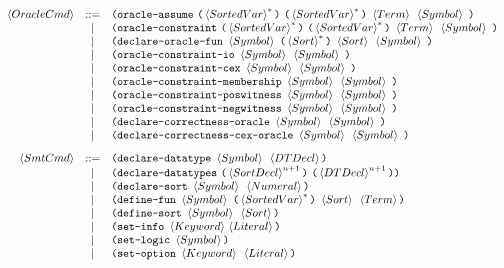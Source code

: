 \documentclass[english,a4paper,10pt]{article}
\begin{document}
\[\begin{array}{rcl}
 \oraclecmd 
 & ::= & \paren{\assumeoraclekwd\mbox{ }\paren{\kstar{\sortedvar}}\mbox{ }\paren{\kstar{\sortedvar}}\mbox{ }
  \term \mbox{ } \symbol\mbox{ }} \\
  & | & \paren{\constraintoraclekwd\mbox{ }\paren{\kstar{\sortedvar}}\mbox{ }\paren{\kstar{\sortedvar}}\mbox{ }
  \term\mbox{ } \symbol\mbox{ }} \\
 & | & \paren{\oracledeckwd\mbox{ }\symbol\mbox{ }\paren{\kstar{\sortexpr}}\mbox{ }\sortexpr\mbox{ }\symbol\mbox{ }} \\
 & | &\paren{\iooracledeckwd\mbox{ }\symbol\mbox{ } \symbol\mbox{ }} \\
 & | &\paren{\cexoracledeckwd\mbox{ }\symbol\mbox{ } \symbol\mbox{ }} \\
 & | &\paren{\memoracledeckwd\mbox{ }\symbol\mbox{ } \symbol\mbox{ }} \\
 & | &\paren{\poswitnessoracledeckwd\mbox{ }\symbol\mbox{ } \symbol\mbox{ }} \\
 & | &\paren{\negwitnessoracledeckwd\mbox{ }\symbol\mbox{ } \symbol\mbox{ }} \\
 & | &\paren{\corroracledeckwd\mbox{ }\symbol\mbox{ } \symbol\mbox{ }} \\
 & | &\paren{\corrcexoracledeckwd\mbox{ }\symbol\mbox{ } \symbol\mbox{ }} \\[2ex]

 \smtcmd 
 & ::= &\paren{\dtdeclkwd\mbox{ }\symbol\mbox{ }\dtdecl} \\
 & | & \paren{\dtsdeclkwd\mbox{ }\paren{\kstarn{\sortdecl}{n+1} }\mbox{ }\paren{\kstarn{\dtdecl}{n+1}}} \\
 & | & \paren{\sortdeclkwd\mbox{ }\symbol\mbox{ }\intconst} \\
 & | & \paren{\fundefkwd\mbox{ }\symbol\mbox{ }\paren{\kstar{\sortedvar}}\mbox{ }\sortexpr\mbox{ }\term} \\  %
 & | & \paren{\sortdefkwd\mbox{ }\symbol\mbox{ }\sortexpr} \\
 & | & \paren{\setinfokwd\mbox{ }\keyword{ }\literal} \\
 & | & \paren{\setlogickwd\mbox{ }\symbol} \\
 & | & \paren{\setoptkwd\mbox{ }\keyword\mbox{ }\literal}
\end{array}
\]
\end{document}
